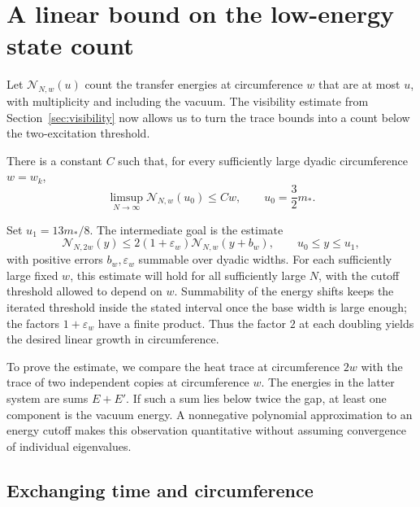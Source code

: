 \section{A linear bound on the low-energy state count}
\label{sec:counting}

Let $\mathcal N_{N,w}(u)$ count the transfer energies at circumference $w$
that are at most $u$, with multiplicity and including the vacuum.
The visibility estimate from Section~\ref{sec:visibility} now allows us to
turn the trace bounds into a count below the two-excitation threshold.

\begin{proposition}\label{cou:linear}
There is a constant $C$ such that, for every sufficiently large dyadic
circumference $w=w_k$,
\begin{equation}\label{cou:linear-eq}
 \limsup_{N\to\infty}\mathcal N_{N,w}(u_0)\le Cw,
 \qquad u_0=\frac32m_*.
\end{equation}
\end{proposition}

Set $u_1=13m_*/8$. The intermediate goal is the estimate
\[
 \mathcal N_{N,2w}(y)
 \le 2(1+\varepsilon_w)\mathcal N_{N,w}(y+b_w),
 \qquad u_0\le y\le u_1,
\]
with positive errors $b_w,\varepsilon_w$ summable over dyadic widths.
For each sufficiently large fixed $w$, this estimate will hold for all
sufficiently large $N$, with the cutoff threshold allowed to depend on
$w$. Summability of the energy shifts keeps the iterated threshold inside
the stated interval once the base width is large enough; the factors
$1+\varepsilon_w$ have a finite product. Thus the factor $2$ at each
doubling yields the desired linear growth in circumference.

To prove the estimate, we compare the heat trace at circumference $2w$
with the trace of two independent copies at circumference $w$. The
energies in the latter system are sums $E+E'$. If such a sum lies below
twice the gap, at least one component is the vacuum energy. A nonnegative
polynomial approximation to an energy cutoff makes this observation
quantitative without assuming convergence of individual eigenvalues.

\subsection{Exchanging time and circumference}

